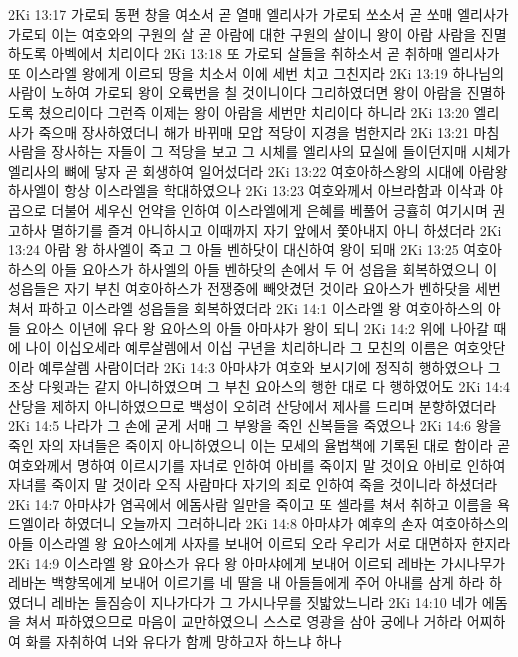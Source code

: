2Ki 13:17  가로되 동편 창을 여소서 곧 열매 엘리사가 가로되 쏘소서 곧 쏘매 엘리사가 가로되 이는 여호와의 구원의 살 곧 아람에 대한 구원의 살이니 왕이 아람 사람을 진멸하도록 아벡에서 치리이다
2Ki 13:18  또 가로되 살들을 취하소서 곧 취하매 엘리사가 또 이스라엘 왕에게 이르되 땅을 치소서 이에 세번 치고 그친지라
2Ki 13:19  하나님의 사람이 노하여 가로되 왕이 오륙번을 칠 것이니이다 그리하였더면 왕이 아람을 진멸하도록 쳤으리이다 그런즉 이제는 왕이 아람을 세번만 치리이다 하니라
2Ki 13:20  엘리사가 죽으매 장사하였더니 해가 바뀌매 모압 적당이 지경을 범한지라
2Ki 13:21  마침 사람을 장사하는 자들이 그 적당을 보고 그 시체를 엘리사의 묘실에 들이던지매 시체가 엘리사의 뼈에 닿자 곧 회생하여 일어섰더라
2Ki 13:22  여호아하스왕의 시대에 아람왕 하사엘이 항상 이스라엘을 학대하였으나
2Ki 13:23  여호와께서 아브라함과 이삭과 야곱으로 더불어 세우신 언약을 인하여 이스라엘에게 은혜를 베풀어 긍휼히 여기시며 권고하사 멸하기를 즐겨 아니하시고 이때까지 자기 앞에서 쫓아내지 아니 하셨더라
2Ki 13:24  아람 왕 하사엘이 죽고 그 아들 벤하닷이 대신하여 왕이 되매
2Ki 13:25  여호아하스의 아들 요아스가 하사엘의 아들 벤하닷의 손에서 두 어 성읍을 회복하였으니 이 성읍들은 자기 부친 여호아하스가 전쟁중에 빼앗겼던 것이라 요아스가 벤하닷을 세번 쳐서 파하고 이스라엘 성읍들을 회복하였더라
2Ki 14:1  이스라엘 왕 여호아하스의 아들 요아스 이년에 유다 왕 요아스의 아들 아마샤가 왕이 되니
2Ki 14:2  위에 나아갈 때에 나이 이십오세라 예루살렘에서 이십 구년을 치리하니라 그 모친의 이름은 여호앗단이라 예루살렘 사람이더라
2Ki 14:3  아마샤가 여호와 보시기에 정직히 행하였으나 그 조상 다윗과는 같지 아니하였으며 그 부친 요아스의 행한 대로 다 행하였어도
2Ki 14:4  산당을 제하지 아니하였으므로 백성이 오히려 산당에서 제사를 드리며 분향하였더라
2Ki 14:5  나라가 그 손에 굳게 서매 그 부왕을 죽인 신복들을 죽였으나
2Ki 14:6  왕을 죽인 자의 자녀들은 죽이지 아니하였으니 이는 모세의 율법책에 기록된 대로 함이라 곧 여호와께서 명하여 이르시기를 자녀로 인하여 아비를 죽이지 말 것이요 아비로 인하여 자녀를 죽이지 말 것이라 오직 사람마다 자기의 죄로 인하여 죽을 것이니라 하셨더라
2Ki 14:7  아마샤가 염곡에서 에돔사람 일만을 죽이고 또 셀라를 쳐서 취하고 이름을 욕드엘이라 하였더니 오늘까지 그러하니라
2Ki 14:8  아마샤가 예후의 손자 여호아하스의 아들 이스라엘 왕 요아스에게 사자를 보내어 이르되 오라 우리가 서로 대면하자 한지라
2Ki 14:9  이스라엘 왕 요아스가 유다 왕 아마샤에게 보내어 이르되 레바논 가시나무가 레바논 백향목에게 보내어 이르기를 네 딸을 내 아들들에게 주어 아내를 삼게 하라 하였더니 레바논 들짐승이 지나가다가 그 가시나무를 짓밟았느니라
2Ki 14:10  네가 에돔을 쳐서 파하였으므로 마음이 교만하였으니 스스로 영광을 삼아 궁에나 거하라 어찌하여 화를 자취하여 너와 유다가 함께 망하고자 하느냐 하나
